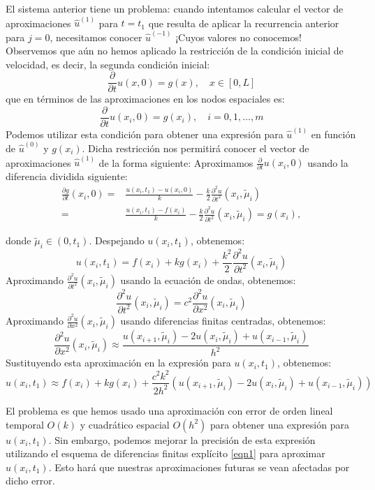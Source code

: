 \documentclass{replab}
\begin{document}
El sistema anterior tiene un problema: cuando intentamos calcular el vector de aproximaciones $\hat{u}^{(1)}$ para $t=t_1$ que resulta de aplicar la recurrencia anterior para $j=0$, necesitamos conocer $\hat{u}^{(-1)}$ ¡Cuyos valores no conocemos!\\

Observemos que aún no hemos aplicado la restricción de la condición inicial de velocidad, es decir, la segunda condición inicial:
$$ \frac{\partial}{\partial t}u(x,0) = g(x), \quad x \in [0,L] $$
que en términos de las aproximaciones en los nodos espaciales es:
$$ \frac{\partial}{\partial t}u(x_i,0) = g(x_i), \quad i=0,1, \ldots, m $$
Podemos utilizar esta condición para obtener una expresión para $\hat{u}^{(1)}$ en función de $\hat{u}^{(0)}$ y $g(x_i)$. Dicha restricción nos permitirá conocer el vector de aproximaciones $\hat{u}^{(1)}$ de la forma siguiente:
Aproximamos $\frac{\partial}{\partial t}u(x_i,0)$ usando la diferencia dividida siguiente:
\begin{align*}
\frac{\partial g}{\partial t}(x_i,0)= & \frac{u(x_i,t_1)-u(x_i,0)}{k}-\frac{k}{2}\frac{\partial^2 u}{\partial t^2}(x_i,\tilde{\mu}_i)\\ = & \frac{u(x_i,t_1)-f(x_i)}{k}-\frac{k}{2}\frac{\partial^2 u}{\partial t^2}(x_i,\tilde{\mu}_i)=g(x_i),
\end{align*}

donde $\tilde{\mu}_i \in (0,t_1)$. Despejando $u(x_i,t_1)$, obtenemos:
$$ u(x_i,t_1) = f(x_i) + k g(x_i) + \frac{k^2}{2} \frac{\partial^2 u}{\partial t^2}(x_i,\tilde{\mu}_i) $$
Aproximando $\frac{\partial^2 u}{\partial t^2}(x_i,\tilde{\mu}_i)$ usando la ecuación de ondas, obtenemos:
$$ \frac{\partial^2 u}{\partial t^2}(x_i,\tilde{\mu}_i) = c^2 \frac{\partial^2 u}{\partial x^2}(x_i,\tilde{\mu}_i) $$
Aproximando $\frac{\partial^2 u}{\partial x^2}(x_i,\tilde{\mu}_i)$ usando diferencias finitas centradas, obtenemos:
$$ \frac{\partial^2 u}{\partial x^2}(x_i,\tilde{\mu}_i) \approx \frac{u(x_{i+1},\tilde{\mu}_i) - 2u(x_i,\tilde{\mu}_i) + u(x_{i-1},\tilde{\mu}_i)}{h^2} $$
Sustituyendo esta aproximación en la expresión para $u(x_i,t_1)$, obtenemos:
$$ u(x_i,t_1) \approx f(x_i) + k g(x_i) + \frac{c^2 k^2}{2h^2} \left( u(x_{i+1},\tilde{\mu}_i) - 2u(x_i,\tilde{\mu}_i) + u(x_{i-1},\tilde{\mu}_i) \right) $$

El problema es que hemos usado una aproximación con error de orden lineal temporal $O(k)$ y cuadrático espacial $O(h^2)$ para obtener una expresión para $u(x_i,t_1)$. Sin embargo, podemos mejorar la precisión de esta expresión utilizando el esquema de diferencias finitas explícito \ref{eqn1} para aproximar $u(x_i,t_1)$. Esto hará que nuestras aproximaciones futuras se vean afectadas por dicho error.\\
\end{document}
